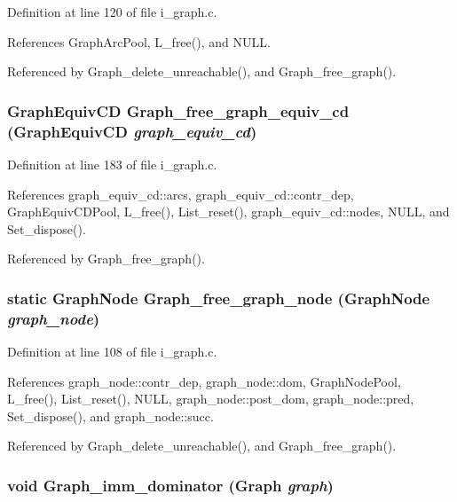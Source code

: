 Definition at line 120 of file i\_\-graph.c.

References Graph\-Arc\-Pool, L\_\-free(), and NULL.

Referenced by Graph\_\-delete\_\-unreachable(), and Graph\_\-free\_\-graph().
\subsubsection{\setlength{\rightskip}{0pt plus 5cm}\bf{Graph\-Equiv\-CD} Graph\_\-free\_\-graph\_\-equiv\_\-cd (\bf{Graph\-Equiv\-CD} {\em graph\_\-equiv\_\-cd})}\label{i__graph_8c_64292a1477c20d7c398cf611d7f40f95}




Definition at line 183 of file i\_\-graph.c.

References graph\_\-equiv\_\-cd::arcs, graph\_\-equiv\_\-cd::contr\_\-dep, Graph\-Equiv\-CDPool, L\_\-free(), List\_\-reset(), graph\_\-equiv\_\-cd::nodes, NULL, and Set\_\-dispose().

Referenced by Graph\_\-free\_\-graph().
\subsubsection{\setlength{\rightskip}{0pt plus 5cm}static \bf{Graph\-Node} Graph\_\-free\_\-graph\_\-node (\bf{Graph\-Node} {\em graph\_\-node})\hspace{0.3cm}{\tt  [static]}}\label{i__graph_8c_8c48377f0db71a2c12d9c820b2c1d170}




Definition at line 108 of file i\_\-graph.c.

References graph\_\-node::contr\_\-dep, graph\_\-node::dom, Graph\-Node\-Pool, L\_\-free(), List\_\-reset(), NULL, graph\_\-node::post\_\-dom, graph\_\-node::pred, Set\_\-dispose(), and graph\_\-node::succ.

Referenced by Graph\_\-delete\_\-unreachable(), and Graph\_\-free\_\-graph().
\subsubsection{\setlength{\rightskip}{0pt plus 5cm}void Graph\_\-imm\_\-dominator (\bf{Graph} {\em graph})}\label{i__graph_8c_5b524304b2f42cecc80184a412c861cf}




